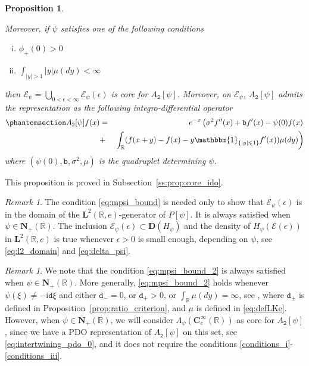 \documentclass[12pt]{amsart}
\newcommand{\hlabel}{\phantomsection\label}
\numberwithin{equation}{section}
\newcommand{\bb}{\mathbb}
\newcommand{\cc}{\mathcal}
\renewcommand{\le}{\leqslant}
\newcommand{\bbm}{\mathbbm}
\newcommand{\ttt}{\mathtt}
\newcommand{\bmrm}[2][2]{\mathbf{#2}^{#1}}
\newcommand{\C}{\mathbf{C}}
\newcommand{\D}{\mathbf{D}}
\newcommand{\eps}{\epsilon}
\renewcommand{\i}{\mathrm{i}}
\newcommand{\LRe}{\bmrm{L}(\bb{R},e)}
\newcommand{\NN}{\mathbf{N}}
\newtheorem{prop}[thm]{Proposition}
\theoremstyle{definition}
\theoremstyle{assump}
\theoremstyle{remark}
\newtheorem{rem}[thm]{Remark}
\begin{document}
{\begin{prop}
\begin{enumerate}[(1)]
Moreover, if $\psi$ satisfies one of the following conditions
\begin{enumerate}[(i)]
	\item\hlabel{conditions_i} $\phi_+(0)>0$
	\item\hlabel{conditions_iii} $\int_{|y|>1} |y|\mu(dy)<\infty$
\end{enumerate}
then $\cc{E}_\psi=\!\!\bigcup\limits_{0<\eps<\infty}\!\!\!\!\cc{E}_\psi(\eps)$ is core for  $A_\ttt{2}[\psi]$. Moreover, on $\cc{E}_\psi$,  $A_\ttt{2}[\psi]$ admits the representation as the following integro-differential operator
\begin{eqnarray}\hlabel{eq:integro_diff}
	A_\ttt{2}[\psi]f(x)&=&e^{-x}\left(\sigma^2 f''(x)+\ttt{b}f'(x)-\psi(0)f(x)\right. \nonumber\\
	&+ & \left. \int_\bb{R}(f(x+y)-f(x)-y\bbm{1}_{\{|y|\le 1\}}f'(x))\mu(dy) \right)
\end{eqnarray}
where $(\psi(0),\ttt{b},\sigma^2,\mu)$ is the quadruplet  determining $\psi$. %
\end{enumerate}
\end{prop}
This proposition is proved in Subsection~\ref{ss:prop:core_ido}.
\begin{rem}
	The condition \eqref{eq:mpsi_bound} is needed only to show that $\cc{E}_\psi(\eps)$ is in the domain of the $\LRe$-generator of $P[\psi]$. It is always satisfied when $\psi\in\NN_+(\bb R)$. The inclusion $\cc{E}_\psi(\eps)\subset\D(H_\psi)$ and the density of $H_\psi(\cc{E}(\eps))$ in $\LRe$ is true whenever $\eps>0$ is small enough, depending on $\psi$, see \eqref{eq:l2_domain} and \eqref{eq:delta_psi}.
\end{rem}
\begin{rem}
	We note that the condition \eqref{eq:mpsi_bound_2} is always satisfied when $\psi\in\NN_+(\bb R)$. More generally, \eqref{eq:mpsi_bound_2} holds whenever $\psi(\xi)\neq -\i\ttt{d}\xi$ and either $\ttt{d}_-=0$, or $\ttt{d}_+>0$, or $\int_{\bb R}\mu(dy)=\infty$, see \cite[Theorem~2.3(1)]{patie2018}, where $\ttt{d}_\pm$ is defined in Proposition~\ref{prop:ratio_criterion}, and $\mu$ is defined in \eqref{eq:defLKe}. However, when $\psi\in\NN_+(\bb R)$, we will consider $\Lambda_\psi(\C^\infty_c(\bb R))$ as core for $A_\ttt{2}[\psi]$, since we have a PDO representation of $A_\ttt{2}[\psi]$ on this set, see \eqref{eq:intertwining_pdo_0}, and it does not require the conditions \eqref{conditions_i}-\eqref{conditions_iii}.
\end{rem}

}
\end{document}
